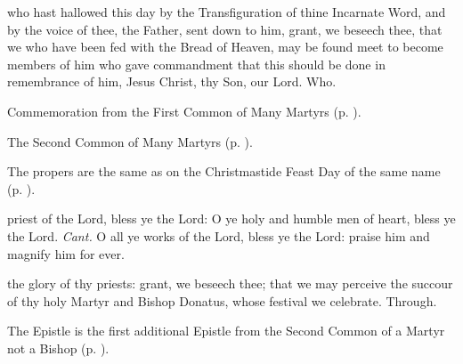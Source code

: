 \vspace{-0.2\baselineskip}

 who hast hallowed this day by the Transfiguration of thine Incarnate Word, and by the voice of thee, the Father, sent down to him, grant, we beseech thee, that we who have been fed with the Bread of Heaven, may be found meet to become members of him who gave commandment that this should be done in remembrance of him, Jesus Christ, thy Son, our Lord. Who.


\begin{rubric}
	 Commemoration  from the First Common of Many Martyrs (p. \pageref{CommonMartyrsIPostcommunion}).
\end{rubric}


\clearpage
{}

\begin{rubric}
	The Second Common of Many Martyrs (p. \pageref{CommonMartyrsII}).
\end{rubric}



\begin{rubric}
    The propers are the same as on the Christmastide Feast Day of the same name (p. \pageref{MostHolyName}).
\end{rubric}



\introit
{} priest of the Lord, bless ye the Lord: O ye holy and humble men of heart, bless ye the Lord. \textit{Cant.} O all ye works of the Lord, bless ye the Lord: praise him and magnify him for ever.

\collect
{} the glory of thy priests: grant, we beseech thee; that we may perceive the succour of thy holy Martyr and Bishop Donatus, whose festival we celebrate. Through.

\begin{rubric}
	The Epistle is the first additional Epistle from the Second Common of a Martyr not a Bishop (p. \pageref{James12}).
\end{rubric}



